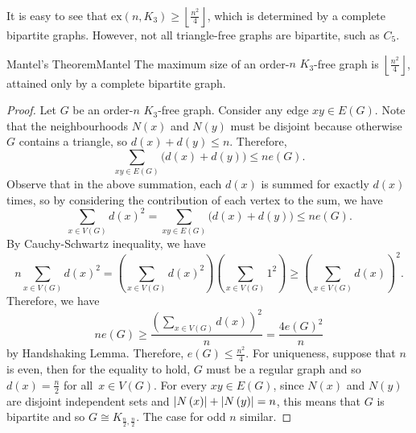 \documentclass[math]{amznotes}
\theoremstyle{remark}
\newcommand{\ex}{\mathrm{ex}}
\begin{document}
It is easy to see that $\ex\left(n, K_3\right) \geq \left\lfloor\frac{n^2}{4}\right\rfloor$, which is determined by a complete bipartite graphs. However, not all triangle-free graphs are bipartite, such as $C_5$.
\begin{thmbox}{Mantel's Theorem}{Mantel}
    The maximum size of an order-$n$ $K_3$-free graph is $\left\lfloor\frac{n^2}{4}\right\rfloor$, attained only by a complete bipartite graph.
    \tcblower
    \begin{proof}
        Let $G$ be an order-$n$ $K_3$-free graph. Consider any edge $xy \in E\left(G\right)$. Note that the neighbourhoods $N\left(x\right)$ and $N\left(y\right)$ must be disjoint because otherwise $G$ contains a triangle, so $d\left(x\right) + d\left(y\right) \leq n$. Therefore,
        \begin{equation*}
            \sum_{xy \in E\left(G\right)}\bigl(d\left(x\right) + d\left(y\right)\bigr) \leq ne\left(G\right).
        \end{equation*}
        Observe that in the above summation, each $d\left(x\right)$ is summed for exactly $d\left(x\right)$ times, so by considering the contribution of each vertex to the sum, we have 
        \begin{equation*}
            \sum_{x \in V\left(G\right)}{d\left(x\right)}^2 = \sum_{xy \in E\left(G\right)}\bigl(d\left(x\right) + d\left(y\right)\bigr) \leq ne\left(G\right).
        \end{equation*}
        By Cauchy-Schwartz inequality, we have
        \begin{equation*}
            n\sum_{x \in V\left(G\right)}{d\left(x\right)}^2 = \left(\sum_{x \in V\left(G\right)}{d\left(x\right)}^2\right)\left(\sum_{x \in V\left(G\right)}1^2\right) \geq \left(\sum_{x \in V\left(G\right)}d\left(x\right)\right)^2.
        \end{equation*} 
        Therefore, we have
        \begin{equation*}
            ne\left(G\right) \geq \frac{\left(\sum_{x \in V\left(G\right)}d\left(x\right)\right)^2}{n} = \frac{4{e\left(G\right)}^2}{n}
        \end{equation*}
        by Handshaking Lemma. Therefore, $e\left(G\right) \leq \frac{n^2}{4}$. For uniqueness, suppose that $n$ is even, then for the equality to hold, $G$ must be a regular graph and so $d\left(x\right) = \frac{n}{2}$ for all~$x \in V\left(G\right)$. For every $xy \in E\left(G\right)$, since $N\left(x\right)$ and $N\left(y\right)$ are disjoint independent sets and ${\left\lvert {N\left(x\right)} \right\rvert} + {\left\lvert {N\left(y\right)} \right\rvert} = n$, this means that $G$ is bipartite and so $G \cong K_{\frac{n}{2}, \frac{n}{2}}$. The case for odd $n$ similar.
    \end{proof}
\end{thmbox}
\end{document}
